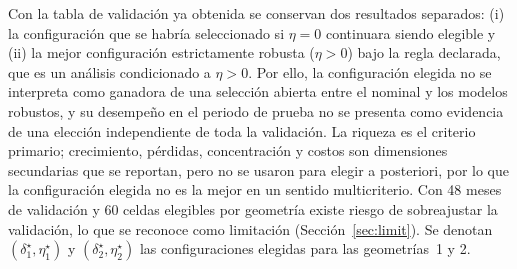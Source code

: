 Con la tabla de validación ya obtenida se conservan dos resultados separados: (i) la configuración que se habría seleccionado si $\eta=0$ continuara siendo elegible y (ii) la mejor configuración estrictamente robusta ($\eta>0$) bajo la regla declarada, que es un análisis condicionado a $\eta>0$. Por ello, la configuración elegida no se interpreta como ganadora de una selección abierta entre el nominal y los modelos robustos, y su desempeño en el periodo de prueba no se presenta como evidencia de una elección independiente de toda la validación. La riqueza es el criterio primario; crecimiento, pérdidas, concentración y costos son dimensiones secundarias que se reportan, pero no se usaron para elegir a posteriori, por lo que la configuración elegida no es la mejor en un sentido multicriterio. Con 48 meses de validación y 60 celdas elegibles por geometría existe riesgo de sobreajustar la validación, lo que se reconoce como limitación (Sección~\ref{sec:limit}). Se denotan $(\delta_1^\star,\eta_1^\star)$ y $(\delta_2^\star,\eta_2^\star)$ las configuraciones elegidas para las geometrías~1 y 2.

